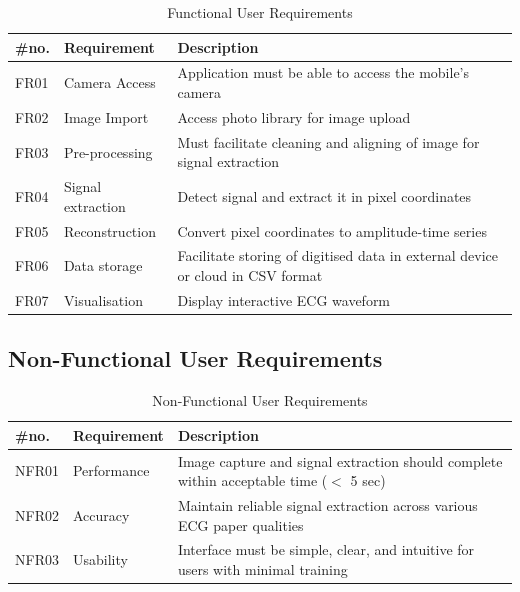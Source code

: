 \begin{table}[H]
	\centering
	\caption{Functional User Requirements}\label{tab:UserReq}
    \begin{tabular}{l|l|p{9.5cm}}
    \hline
    \textbf{\#no.} & \textbf{Requirement}       & \textbf{Description}                                                                    \\
	\hline
    FR01  & Camera Access     & Application must be able to access the mobile's camera                         \\
    FR02  & Image Import      & Access photo library for image upload                                          \\
    FR03  & Pre-processing    & Must facilitate cleaning and aligning of image for signal extraction           \\
    FR04  & Signal extraction & Detect signal and extract it in pixel coordinates                              \\
    FR05  & Reconstruction    & Convert pixel coordinates to amplitude-time series                             \\
    FR06  & Data storage      & Facilitate storing of digitised data in external device or cloud in CSV format \\
    FR07  & Visualisation     & Display interactive ECG waveform                                               \\
	\hline
    \end{tabular}
\end{table}

\subsection{Non-Functional User Requirements}

\begin{table}[H]
	\centering
	\caption{Non-Functional User Requirements}\label{tab:NonFuncReq}
    \begin{tabular}{l|l|p{9.5cm}}
    \hline
    \textbf{\#no.} & \textbf{Requirement}       & \textbf{Description}                                                   \\
	\hline
    NFR01 & Performance         & Image capture and signal extraction should complete within acceptable time ($<$ 5 sec) \\
    NFR02 & Accuracy            & Maintain reliable signal extraction across various ECG paper qualities              \\
    NFR03 & Usability           & Interface must be simple, clear, and intuitive for users with minimal training      \\
    \hline
    \end{tabular}
\end{table}

